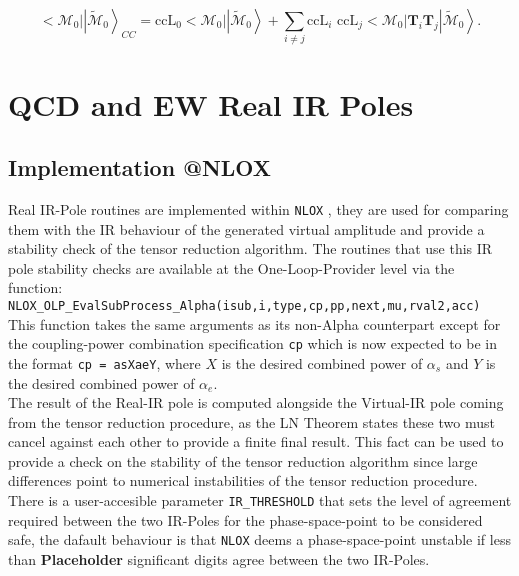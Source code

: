 \documentclass[a4paper]{article}
\def \NLOX{\texttt{NLOX} }
\def \Placeholder{ \textbf{Placeholder }}
\begin{document}
\begin{equation}
  \Big<\mathcal{M}_0\Big|\left|\mathcal{\tilde M}_0\right>_{CC} = 
 \text{ccL}_0 \Big<\mathcal{M}_0\Big|\left|\mathcal{\tilde M}_0\right> +  
 \sum_{i \neq j} \text{ccL}_i\text{ ccL}_j \Big<\mathcal{M}_0\Big|\textbf{T}_i\textbf{T}_j\left|\mathcal{\tilde M}_0\right>.
\end{equation}

\section{QCD and EW Real IR Poles}
\subsection{Implementation @NLOX}

Real IR-Pole routines are implemented within \NLOX, they are used 
for comparing them with the IR behaviour of the generated virtual 
amplitude and provide a stability check of the tensor reduction algorithm. 
The routines that use this IR pole stability checks are available at the 
One-Loop-Provider level via the function:\\

\texttt{NLOX\_OLP\_EvalSubProcess\_Alpha(isub,i,type,cp,pp,next,mu,rval2,acc)}\\

This function takes the same arguments as its non-Alpha counterpart except for the coupling-power
combination specification \texttt{cp} which is now expected to be in the format \texttt{cp = asXaeY},
where $X$ is the desired combined power of $\alpha_s$ and $Y$ is the desired combined power of $\alpha_e$.\\

The result of the Real-IR pole is computed alongside the Virtual-IR pole coming from the tensor reduction
procedure, as the LN Theorem states these two must cancel against each other to provide a finite 
final result. This fact can be used to provide a check on the stability of the tensor reduction 
algorithm since large differences point to numerical instabilities of the tensor reduction 
procedure. There is a user-accesible parameter \texttt{IR\_THRESHOLD} that sets the level 
of agreement required between the two IR-Poles for the phase-space-point to be considered safe,
the dafault behaviour is that \NLOX deems a phase-space-point unstable if less than \Placeholder significant
digits agree between the two IR-Poles. \\
\end{document}
